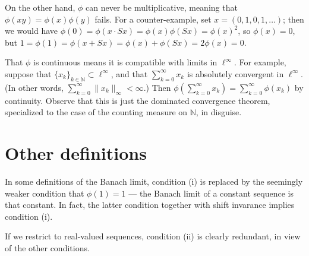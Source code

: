 \documentclass[12pt]{article}
\newcommand{\nat}{\mathbb{N}}
\newcommand{\elli}{\ell^\infty}
\providecommand{\norm}[1]{\lVert#1\rVert}
\begin{document}
On the other hand, $\phi$ can never be multiplicative, meaning that
$\phi(xy) = \phi(x) \phi(y)$ fails.
For a counter-example, set $x = (0, 1, 0, 1, \dotsc)$; then we would have
$\phi(0) = \phi(x \cdot Sx) = \phi(x) \phi(Sx) = \phi(x)^2$, so $\phi(x) = 0$,
but $1 = \phi(1) = \phi(x + Sx) = \phi(x) + \phi(Sx) = 2\phi(x) = 0$.

That $\phi$ is continuous means it is compatible with limits in $\elli$.
For example, suppose that $\{ x_k \}_{k \in \nat} \subset \ell^\infty$,
and that $\sum_{k=0}^\infty x_k$ is absolutely convergent in $\elli$.
(In other words, $\sum_{k=0}^\infty \norm{x_k}_\infty < \infty$.)
Then $\phi(\sum_{k=0}^\infty x_k) = \sum_{k=0}^\infty \phi(x_k)$
by continuity.
Observe that this is just the dominated convergence theorem, specialized
to the case of the counting measure on $\nat$, in disguise.

\section{Other definitions}
In some definitions of the Banach limit, condition (i) is replaced
by the seemingly weaker condition that $\phi(1) = 1$ --- 
the Banach limit of a constant sequence is that constant.
In fact, the latter condition together with shift invarance implies condition (i).

If we restrict to real-valued sequences,
condition (ii) is clearly redundant, in view of the other conditions.
\end{document}
